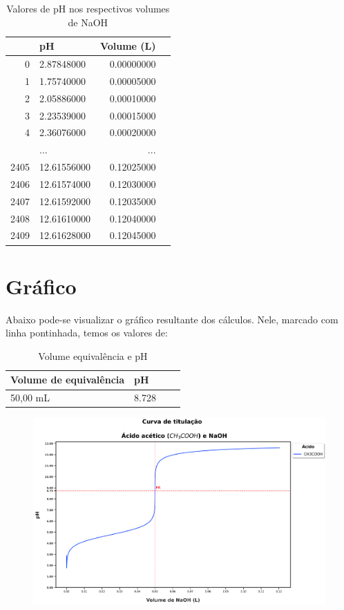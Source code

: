 \documentclass[a4paper, 12pt]{article}
\begin{document}
\begin{table}[H]
	\begin{center}
		\caption{Valores de pH nos respectivos volumes de NaOH}
		\label{demo-table}
		\begin{tabular}{rp{5cm}rp{5cm}}\toprule
			& \textbf{pH} & \textbf{Volume (L)} \\ \midrule			
			0 & 2.87848000 & 0.00000000 \\ 
			1 & 1.75740000 & 0.00005000 \\ 
			2 & 2.05886000 & 0.00010000 \\
			3 & 2.23539000 & 0.00015000 \\
			4 & 2.36076000 & 0.00020000 \\
			& ... & ... \\
			2405 & 12.61556000 & 0.12025000 \\
			2406 & 12.61574000 & 0.12030000 \\
			2407 & 12.61592000 & 0.12035000 \\
			2408 & 12.61610000 & 0.12040000 \\
			2409 & 12.61628000 & 0.12045000 \\
			\bottomrule
		\end{tabular}
	\end{center}
\end{table}

\section{Gráfico}
Abaixo pode-se visualizar o gráfico resultante dos cálculos. Nele, marcado com linha pontinhada, temos os valores de:

\begin{table}[H]
	\begin{center}
		\caption{Volume equivalência e pH}
		\label{tabela_vol_eq_e_pH}\textbf{}
		\begin{tabular}{lp{5cm}lp{10cm}}\toprule
			\textbf{Volume de equivalência} & \textbf{pH} \\ \midrule
			50,00 mL & 8.728 \\ 
			\bottomrule
		\end{tabular}
	\end{center}
\end{table}

\begin{figure}[H]
	\centering
	\includegraphics[width=0.99\linewidth]{curvas_de_titulacao_ac_acetico_e_hidroxido_de_sodio}
	\caption[Curva de Titulação]{}
	\label{fig:curvasdetitulacaoacaceticoehidroxidodesodio}
\end{figure}
\end{document}
